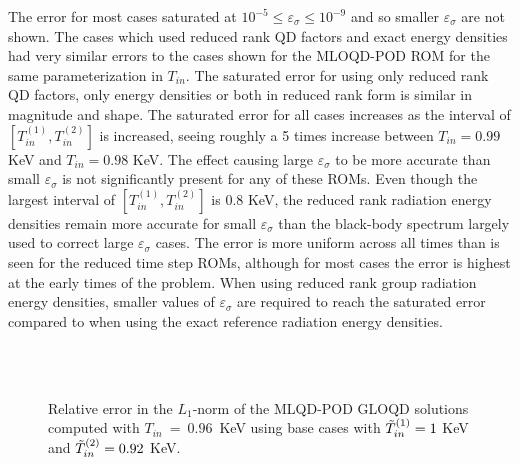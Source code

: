 	\ind The error for most cases saturated at $10^{-5} \leq \varepsilon_\sigma \leq 10^{-9}$ and so smaller $\varepsilon_\sigma$ are not shown. The cases which used reduced rank QD factors and exact energy densities had very similar errors to the cases shown for the MLOQD-POD ROM for the same parameterization in $T_{in}$. The saturated error for using only reduced rank QD factors, only energy densities or both in reduced rank form is similar in magnitude and shape. The saturated error for all cases increases as the interval of  $[T_{in}^{(1)},T_{in}^{(2)}]$ is increased, seeing roughly a 5 times increase between $T_{in}= 0.99$ KeV and $T_{in}= 0.98$ KeV. The effect causing large $\varepsilon_\sigma$ to be more accurate than small $\varepsilon_\sigma$ is not significantly present for any of these ROMs. Even though the largest interval of $[T_{in}^{(1)},T_{in}^{(2)}]$ is $0.8$ KeV, the reduced rank radiation energy densities remain more accurate for small $\varepsilon_\sigma$ than the black-body spectrum largely used to correct large $\varepsilon_\sigma$ cases. The error is more uniform across all times than is seen for the reduced time step ROMs, although for most cases the error is highest at the early times of the problem. When using reduced rank group radiation energy densities, smaller values of $\varepsilon_\sigma$ are required to reach the saturated error compared to when using the exact reference radiation energy densities.

	\begin{figure}[ht!]
		\centering
		\\
		\\
		\caption{\label{fig:errors_bc_T=960_grey}
			Relative error in the $L_1$-norm of the MLQD-POD GLOQD solutions computed with $T_{in}~=~0.96$~KeV using base cases with $\tilde T_{in}^{\left(1\right)}=1$ KeV  and $\tilde T_{in}^{\left(2\right)}=0.92$ KeV.}
	\end{figure}

	\fi
